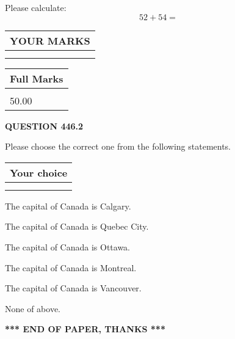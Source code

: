 \documentclass[12pt]{article}
\begin{document}
  
 
Please calculate:
\begin{equation}
52 +  %
54 = \nonumber
\end{equation}
 

 

 
  
\vspace{0.2in}
  
\noindent\begin{tabular}{|l|}
\hline
 YOUR MARKS  \\
\hline
 \\ 
 \\ 
\hline
\end{tabular}
\hspace{0.05in} \begin{tabular}{|l|}
\hline
 Full Marks  \\
\hline
 \\ 
50.00 \\
\hline
\end{tabular}
{\textbf{\Large{QUESTION
446.2 
}}}
  
  
Please choose the correct one from the following statements.
  
  
\noindent\hspace{3.0in} \begin{tabular}{|l|}
\hline
Your choice \\
\hline
 \\ 
 \\ 
\hline
\end{tabular}
  
  
 
 
The capital of Canada is Calgary.
 
 
The capital of Canada is Quebec City.
 
 
The capital of Canada is Ottawa.
 
 
The capital of Canada is Montreal.
 
 
The capital of Canada is Vancouver.
 
 
 None of above.
 
 
   
   
 \vspace{0.2in}
 
   
   
   
   
\vspace{1.0in} 
{\textbf{\large{ *** END OF PAPER, THANKS *** }}} 
   
\end{document}

